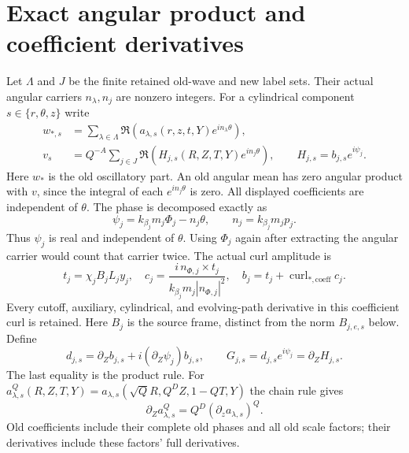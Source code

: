 \section{Exact angular product and coefficient derivatives}
\label{eflux:kernel-section}
Let $\Lambda$ and $J$ be the finite retained old-wave and new label sets.
Their actual angular carriers $n_\lambda,n_j$ are nonzero integers.
For a cylindrical component $s\in\{r,\theta,z\}$ write
\begin{align}
w_{*,s}&=\sum_{\lambda\in\Lambda}
 \Re(a_{\lambda,s}(r,z,t,Y)e^{in_\lambda\theta}),\nonumber\\
v_s&=Q^{-A}\sum_{j\in J}
 \Re(H_{j,s}(R,Z,T,Y)e^{in_j\theta}),\qquad
 H_{j,s}=b_{j,s}e^{i\psi_j}.
\label{eflux:fields}
\end{align}
Here $w_*$ is the old oscillatory part. An old angular mean has zero
angular product with $v$, since the integral of each
$e^{in_j\theta}$ is zero. All displayed coefficients are independent
of $\theta$. The phase is decomposed exactly as
\[
\psi_j=k_{\beta_j}m_j\Phi_j-n_j\theta,\qquad
n_j=k_{\beta_j}m_jp_j.
\]
Thus $\psi_j$ is real and independent of $\theta$.
Using $\Phi_j$ again after extracting the angular carrier would count
that carrier twice. The actual curl amplitude is
\[
t_j=\chi_jB_jL_jy_j,\quad
c_j=\frac{i\,n_{\Phi,j}\times t_j}{k_{\beta_j}m_j|n_{\Phi,j}|^2},
\quad b_j=t_j+\operatorname{curl}_{*,\mathrm{coeff}}c_j.
\]
Every cutoff, auxiliary, cylindrical, and evolving-path derivative in
this coefficient curl is retained. Here $B_j$ is the source frame,
distinct from the norm $B_{j,e,s}$ below. Define
\begin{equation}
d_{j,s}=\partial_Zb_{j,s}+i(\partial_Z\psi_j)b_{j,s},\qquad
G_{j,s}=d_{j,s}e^{i\psi_j}=\partial_ZH_{j,s}.
\label{eflux:d}
\end{equation}
The last equality is the product rule.
For $a^Q_{\lambda,s}(R,Z,T,Y)
=a_{\lambda,s}(\sqrt Q R,Q^DZ,1-QT,Y)$ the chain rule gives
\begin{equation}
\partial_Za^Q_{\lambda,s}=Q^D(\partial_za_{\lambda,s})^Q.
\label{eflux:old-chain}
\end{equation}
Old coefficients include their complete old phases and all old scale
factors; their derivatives include these factors' full derivatives.

